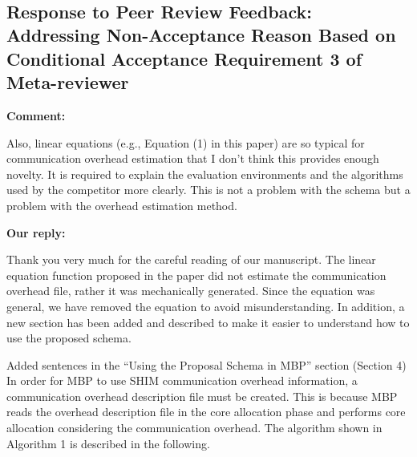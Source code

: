 \documentclass{article}
\begin{document}
\\





\newpage
\subsection{Response to Peer Review Feedback: Addressing Non-Acceptance Reason Based on Conditional Acceptance Requirement 3 of Meta-reviewer}
\begin{flushleft}
  \textbf{Comment:}

\end{flushleft}
\begin{adjustwidth}{1cm}{1cm}  %
 Also, linear equations (e.g., Equation (1) in this paper) are so typical for communication overhead estimation that I don't think this provides enough novelty.
  It is required to explain the evaluation environments and the algorithms used by the competitor more clearly.
  This is not a problem with the schema but a problem with the overhead estimation method.
\end{adjustwidth}
    
    
\begin{flushleft}
  \textbf{Our reply:}
\end{flushleft}

\begin{adjustwidth}{1cm}{1cm}  %
Thank you very much for the careful reading of our manuscript. The linear equation function proposed in the paper did not estimate the communication overhead file, rather it was mechanically generated. Since the equation was general, we have removed the equation to avoid misunderstanding.
In addition, a new section has been added and described to make it easier to understand how to use the proposed schema.
\end{adjustwidth}
\bigskip
\begin{itembox}[|]{Added sentences in the “Using the Proposal Schema in MBP” section (Section 4)}
In order for MBP to use SHIM communication overhead information, a communication overhead description file must be created. This is because MBP reads the overhead description file in the core allocation phase and performs core allocation considering the communication overhead. The algorithm shown in Algorithm 1 is described in the following.
\end{itembox}\\
\end{document}
